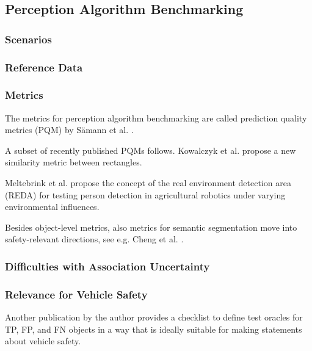 \documentclass[conference]{IEEEtran}
\begin{document}
\subsection{Perception Algorithm Benchmarking}
\label{sec:developer_testing}

\subsubsection{Scenarios}
\label{sec:percBenchmarkingScenarios}
\subsubsection{Reference Data}
\subsubsection{Metrics}
\label{sec:perc_algo_benchm_metrics}

The metrics for perception algorithm benchmarking are called prediction quality metrics (PQM) by Sämann et al. \cite{Saemann2020strategy}.

A subset of recently published PQMs follows. 
Kowalczyk et al. \cite{Kowalczyk2022rectangle} propose a new similarity metric between rectangles. 

Meltebrink et al. \cite{Meltebrink2022reda} propose the concept of the real environment detection area (REDA) for testing person detection in agricultural robotics under varying environmental influences.

Besides object-level metrics, also metrics for semantic segmentation move into safety-relevant directions, see e.g. Cheng et al. \cite{Cheng2021safetymetrics}.

\subsubsection{Difficulties with Association Uncertainty}
\label{sec:association_uncertainty}



\subsubsection{Relevance for Vehicle Safety}
\label{sec:safety_relevance_dev_metrics}

Another publication by the author \cite{Hoss2023checklistarxiv} provides a checklist to define test oracles for TP, FP, and FN objects in a way that is ideally suitable for making statements about vehicle safety. 
\end{document}
